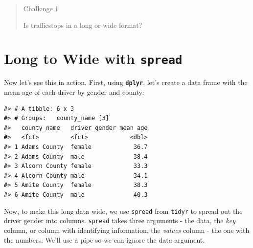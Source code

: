 \documentclass[]{book}
\newenvironment{Shaded}{\begin{snugshade}}{\end{snugshade}}
\newcommand{\KeywordTok}[1]{\textcolor[rgb]{0.13,0.29,0.53}{\textbf{#1}}}
\newcommand{\DataTypeTok}[1]{\textcolor[rgb]{0.13,0.29,0.53}{#1}}
\newcommand{\StringTok}[1]{\textcolor[rgb]{0.31,0.60,0.02}{#1}}
\newcommand{\OtherTok}[1]{\textcolor[rgb]{0.56,0.35,0.01}{#1}}
\newcommand{\OperatorTok}[1]{\textcolor[rgb]{0.81,0.36,0.00}{\textbf{#1}}}
\newcommand{\NormalTok}[1]{#1}
\theoremstyle{definition}
\theoremstyle{definition}
\theoremstyle{definition}
\theoremstyle{remark}
\begin{document}
\begin{quote}
Challenge 1

Is trafficstops in a long or wide format?
\end{quote}

\section{\texorpdfstring{Long to Wide with
\texttt{spread}}{Long to Wide with spread}}\label{long-to-wide-with-spread}

Now let's see this in action. First, using \textbf{\texttt{dplyr}},
let's create a data frame with the mean age of each driver by gender and
county:

\begin{Shaded}
\end{Shaded}

\begin{verbatim}
#> # A tibble: 6 x 3
#> # Groups:   county_name [3]
#>   county_name   driver_gender mean_age
#>   <fct>         <fct>            <dbl>
#> 1 Adams County  female            36.7
#> 2 Adams County  male              38.4
#> 3 Alcorn County female            33.3
#> 4 Alcorn County male              34.1
#> 5 Amite County  female            38.3
#> 6 Amite County  male              40.3
\end{verbatim}

Now, to make this long data wide, we use \texttt{spread} from
\texttt{tidyr} to spread out the driver gender into columns.
\texttt{spread} takes three arguments - the data, the \emph{key} column,
or column with identifying information, the \emph{values} column - the
one with the numbers. We'll use a pipe so we can ignore the data
argument.

\begin{Shaded}
\end{Shaded}
\end{document}
